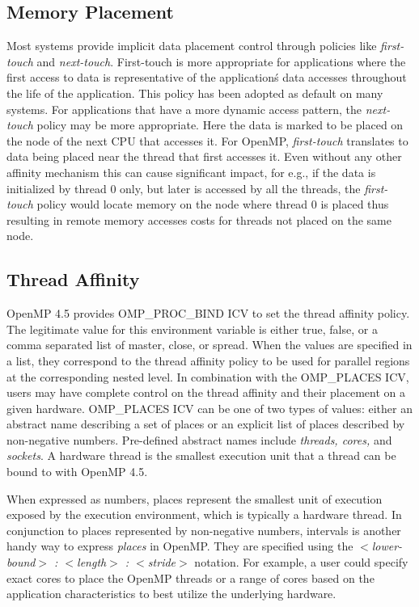 \subsection{Memory Placement}
Most systems provide implicit data placement control through policies like \textit{first-touch} 
and \textit{next-touch}. First-touch is more appropriate for applications where the 
first access to data is representative of the application\'s data accesses throughout 
the life of the application. This policy has been adopted as default on many systems. 
For applications that have a more dynamic access pattern, the \textit{next-touch} 
policy may be more appropriate. Here the data is marked to be placed on the node of the 
next CPU that accesses it. For OpenMP, \textit{first-touch} translates to data being 
placed near the thread that first accesses it. Even without any other affinity mechanism this 
can cause significant impact, for e.g., if the data is initialized by thread 0 only, but later is accessed 
by all the threads, the \textit{first-touch} policy would locate memory on the node where 
thread 0 is placed thus resulting in remote memory accesses costs for threads not placed on the same node. 

\subsection{Thread Affinity}
OpenMP 4.5 provides OMP\_PROC\_BIND ICV to set the thread affinity policy. The legitimate value for 
this environment variable is either true, false, or a comma separated list of master, close, or spread. 
When the values are specified in a list, they correspond to the thread affinity policy to be used for 
parallel regions at the corresponding nested level. In combination with the OMP\_PLACES ICV, 
users may have complete control on the thread affinity and their placement on a given hardware. 
OMP\_PLACES ICV can be one of two types of values: either an abstract name describing a set 
of places or an explicit list of places described by non-negative numbers. Pre-defined abstract 
names include \textit{threads, cores,} and \textit{sockets}. A hardware thread is the smallest execution 
unit that a thread can be bound to with OpenMP 4.5. 


When expressed as numbers, places 
represent the smallest unit of execution exposed by the execution environment, which is typically 
a hardware thread. In conjunction to places represented by non-negative numbers, intervals is another handy way to 
express \textit{places} in OpenMP. They are specified using the \textit{$<$lower-bound$>$ : $<$length$>$ : $<$stride$>$} notation. For example, a user could specify exact cores to place the OpenMP threads or a range of cores based on the application characteristics to best utilize the underlying hardware.


